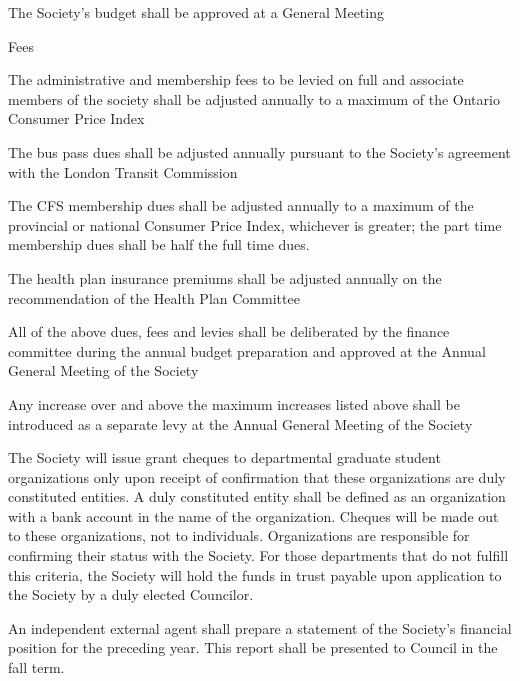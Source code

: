 \begin{longenum}[ label*=\thesection.\arabic*., align=left]
    \item The Society's budget shall be approved at a General Meeting
    \item Fees
    \begin{longenum}[ label*=\arabic*., align=left]
		\item The administrative and membership fees to be levied on full and associate members of the society shall be adjusted annually to a maximum of the Ontario Consumer Price Index
        \item The bus pass dues shall be adjusted annually pursuant to the Society's agreement with the London Transit
Commission
		\item The CFS membership dues shall be adjusted annually to a maximum of the provincial or national Consumer Price Index, whichever is greater; the part time membership dues shall be half the full time dues.
        \item The health plan insurance premiums shall be adjusted annually on the recommendation of the Health Plan Committee
        \item All of the above dues, fees and levies shall be deliberated by the finance committee during the annual budget preparation and approved at the Annual General Meeting of the
Society
		\item Any increase over and above the maximum increases listed above shall be introduced as a separate levy at the Annual General Meeting of the Society
	\end{longenum}
    \item The Society will issue grant cheques to departmental graduate student organizations only upon receipt of confirmation that these organizations are duly constituted entities. A duly constituted entity shall be defined as an organization with a bank account in the name of the organization. Cheques will be made out to these organizations, not to individuals. Organizations are responsible for confirming their status with the Society. For those departments that do not fulfill this criteria, the Society will hold the funds in trust payable upon application to the Society by a duly elected Councilor.
    \item An independent external agent shall prepare a statement of the Society's financial position for the preceding year. This report shall be presented to Council in the fall term.
\end{longenum}
\newpage




